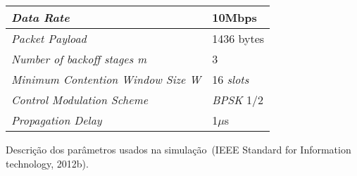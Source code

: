 \documentclass[12pt,openright,oneside,chapter=TITLE,section=TITLE,
	brazil]{utfpr-pg}
\begin{document}
\begin{quadro}[h]
	\centering
	\renewcommand{\arraystretch}{1.1}
	\begin{tabular}{|l|l|}
		\hline
		\textit{Data Rate}					&	10Mbps		\\\hline
		\textit{Packet Payload}				&	1436 bytes	\\\hline
		\textit{Number of backoff stages \emph{m}}	&	3			\\\hline
		\textit{Minimum Contention Window Size W}	&	16 \textit{slots} \\\hline
		\textit{Control Modulation Scheme}	&	\textit{BPSK} 1/2 \\\hline
		\textit{Propagation Delay}			&	1$\mu$s		\\
		\hline
	\end{tabular}
	\parbox{0.55\textwidth}{\caption{Descrição dos parâmetros usados na simulação~(IEEE Standard for Information technology, 2012b).}}
	\label{table:SimulationParameters}
\end{quadro}


% 

\postextual



\end{document}
